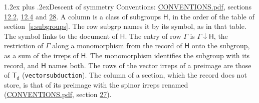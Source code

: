 \documentclass[10pt,a4paper]{article}
\makeatletter
\renewcommand\section{\@startsection{section}{1}{\z@}{-3ex plus -1ex minus -.2ex}%
  {1.2ex plus .2ex}{\normalfont\large\sffamily\bfseries\color{parttitle}}}
\numberwithin{equation}{section}
\newcommand{\grp}[1]{\mathsf{#1}}
\newcommand{\restr}[2]{#1\!\downarrow#2}
\makeatother
\begin{document}
\section{Descent of symmetry}\label{s:subduction}
Conventions: \href{../../CONVENTIONS.pdf}{CONVENTIONS.pdf}, sections \href{../../../rotation/CONVENTIONS.pdf\#conv.12.2}{12.2}, \href{../../../rotation/CONVENTIONS.pdf\#conv.12.4}{12.4} and \href{../../CONVENTIONS.pdf\#conv.28}{28}.
A column is a class of subgroups $\grp{H}$, in the order of the table of section~\ref{s:subgroups}. The row subgrp names it by its symbol, as in that table. The symbol links to the document of $\grp{H}$. The entry of row $\Gamma$ is $\restr{\Gamma}{\grp{H}}$, the restriction of $\Gamma$ along a monomorphism from the record of $\grp{H}$ onto the subgroup, as a sum of the irreps of $\grp{H}$. The monomorphism identifies the subgroup with its record, and $\grp{H}$ names both. The rows of the vector irreps of a preimage are those of \href{../../../rotation/data/pdf/Td.pdf}{$\grp{T_{d}}$} (\texttt{vectorsubduction}). The column of a section, which the record does not store, is that of its preimage with the spinor irreps renamed (\href{../../CONVENTIONS.pdf}{CONVENTIONS.pdf}, section \href{../../CONVENTIONS.pdf\#conv.27}{27}).
\end{document}
